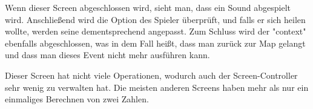 Wenn dieser Screen abgeschlossen wird, sieht man, dass ein Sound abgespielt wird.
Anschließend wird die Option des Spieler überprüft, und falls er sich heilen wollte, werden seine dementsprechend angepasst.
Zum Schluss wird der "context" ebenfalls abgeschlossen, was in dem Fall heißt, dass man zurück zur Map gelangt und dass man dieses Event nicht mehr ausführen kann.

Dieser Screen hat nicht viele Operationen, wodurch auch der Screen-Controller sehr wenig zu verwalten hat.
Die meisten anderen Screens haben mehr als nur ein einmaliges Berechnen von zwei Zahlen.